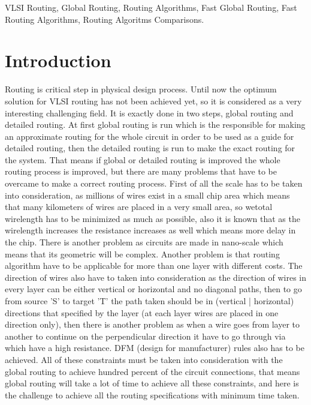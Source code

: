 \documentclass[conference]{IEEEtran}
\begin{document}

\begin{IEEEkeywords}
VLSI Routing, Global Routing, Routing Algorithms, Fast Global Routing, Fast Routing Algorithms, Routing Algoritms Comparisons.
\end{IEEEkeywords}


\section{Introduction}

Routing is critical step in physical design process. Until now the optimum solution for VLSI routing has not been achieved yet, so it is considered as a very interesting challenging field. It is exactly done in two steps, global routing and detailed routing. At first global routing is run which is the responsible for making an approximate routing for the whole circuit in order to be used as a guide for detailed routing, then the detailed routing is run to make the exact routing for the system. That means if global or detailed routing is improved the whole routing process is improved, but there are many problems that have to be overcame to make a correct routing process. First of all the scale has to be taken into consideration, as millions of wires exist in a small chip area which means that many kilometers of wires are placed in a very small area, so wetotal wirelength has to be minimized as much as possible, also it is known that as the wirelength increases the resistance increases as well which means more delay in the chip. There is another problem as circuits are made in nano-scale which means that its geometric will be complex. Another problem is that routing algorithm have to be applicable for more than one layer with different costs. The direction of wires also have to taken into consideration as the direction of wires in every layer can be either vertical or horizontal and no diagonal paths, then to go from source 'S' to target 'T' the path taken should be in (vertical | horizontal) directions that specified by the layer (at each layer wires are placed in one direction only), then there is another problem as when a wire goes from layer to another to continue on the perpendicular direction it have to go through via which have a high resistance. DFM (design for manufacturer) rules also has to be achieved. All of these constraints must be taken into consideration with the global routing to achieve hundred percent of the circuit connections, that means global routing will take a lot of time to achieve all these constraints, and here is the challenge to achieve all the routing specifications with minimum time taken. 
\end{document}
